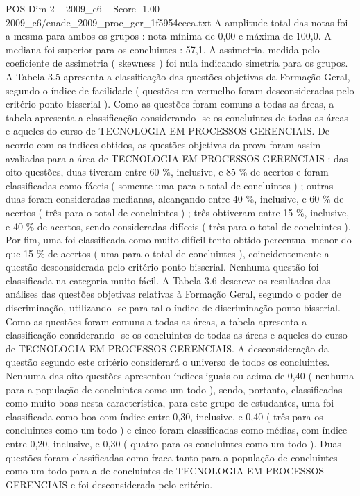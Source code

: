 \begin{textsample}{POS Dim 2 – 2009\_c6 – Score -1.00 – 2009\_c6/enade\_2009\_proc\_ger\_1f5954ceea.txt}
A amplitude total das notas foi a mesma para ambos os grupos : nota mínima de 0,00 e máxima de 100,0.
A mediana foi superior para os concluintes : 57,1.
A assimetria, medida pelo coeficiente de assimetria ( skewness ) foi nula indicando simetria para os grupos.
A Tabela 3.5 apresenta a classificação das questões objetivas da Formação Geral, segundo o índice de facilidade ( questões em vermelho foram desconsideradas pelo critério ponto-bisserial ).
Como as questões foram comuns a todas as áreas, a tabela apresenta a classificação considerando -se os concluintes de todas as áreas e aqueles do curso de TECNOLOGIA EM PROCESSOS GERENCIAIS.
De acordo com os índices obtidos, as questões objetivas da prova foram assim avaliadas para a área de TECNOLOGIA EM PROCESSOS GERENCIAIS : das oito questões, duas tiveram entre 60 \%, inclusive, e 85 \% de acertos e foram classificadas como fáceis ( somente uma para o total de concluintes ) ; outras duas foram consideradas medianas, alcançando entre 40 \%, inclusive, e 60 \% de acertos ( três para o total de concluintes ) ; três obtiveram entre 15 \%, inclusive, e 40 \% de acertos, sendo consideradas difíceis ( três para o total de concluintes ).
Por fim, uma foi classificada como muito difícil tento obtido percentual menor do que 15 \% de acertos ( uma para o total de concluintes ), coincidentemente a questão desconsiderada pelo critério ponto-bisserial.
Nenhuma questão foi classificada na categoria muito fácil.
A Tabela 3.6 descreve os resultados das análises das questões objetivas relativas à Formação Geral, segundo o poder de discriminação, utilizando -se para tal o índice de discriminação ponto-bisserial.
Como as questões foram comuns a todas as áreas, a tabela apresenta a classificação considerando -se os concluintes de todas as áreas e aqueles do curso de TECNOLOGIA EM PROCESSOS GERENCIAIS.
A desconsideração da questão segundo este critério considerará o universo de todos os concluintes.
Nenhuma das oito questões apresentou índices iguais ou acima de 0,40 ( nenhuma para a população de concluintes como um todo ), sendo, portanto, classificadas como muito boas nesta característica, para este grupo de estudantes, uma foi classificada como boa com índice entre 0,30, inclusive, e 0,40 ( três para os concluintes como um todo ) e cinco foram classificadas como médias, com índice entre 0,20, inclusive, e 0,30 ( quatro para os concluintes como um todo ).
Duas questões foram classificadas como fraca tanto para a população de concluintes como um todo para a de concluintes de TECNOLOGIA EM PROCESSOS GERENCIAIS e foi desconsiderada pelo critério.

\end{textsample}
